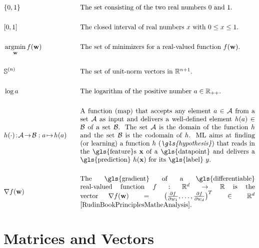 \newpage
\begin{align}
		&\{0,1\}& \quad & \mbox{The set consisting of the two real numbers $0$ and $1$.} \nonumber \\[5mm]
	&[0,1] &\quad &\mbox{The closed interval of real numbers $x$ with $0 \leq x \leq 1$. } \nonumber \\[5mm]
    &\argmin_{\weights} f(\weights) &\quad &\mbox{The set of minimizers for a real-valued function $f(\weights)$.  } \nonumber \\[5mm]
    &\sphere{\nrnodes} &\quad &\mbox{The set of unit-norm vectors in $\mathbb{R}^{\nrnodes+1}$.  } \nonumber \\[5mm]
	 &\log a &\quad &\mbox{The logarithm of the positive number $a \in \mathbb{R}_{++}$.  } \nonumber \\[5mm]
	 &h(\cdot)\!:\!\mathcal{A}\!\rightarrow\!\mathcal{B} :  a \!\mapsto\!h(a) &\quad &\parbox{.75\textwidth}{
	 	A function (map) that accepts any element $a \in \mathcal{A}$ from a set $\mathcal{A}$ 
	 	as input and delivers a well-defined element $h(a) \in \mathcal{B}$ of a set $\mathcal{B}$. 
	 	The set $\mathcal{A}$ is the domain of the function $h$ and the set $\mathcal{B}$ is the 
	 	codomain of $h$. ML aims at finding (or learning) a function $\hypothesis$ (\emph{\gls{hypothesis}}) 
	 	that reads in the \gls{feature}s $\featurevec$ of a \gls{datapoint} and delivers a \gls{prediction} $h(\featurevec)$
	 	for its \gls{label} $\truelabel$.} \nonumber  \\[5mm]	
	 	&\nabla f(\weights) & \quad & \parbox{.75\textwidth}{The \gls{gradient} of a \gls{differentiable} real-valued function 
	 	$f: \mathbb{R}^{\featuredim}\rightarrow \mathbb{R}$ is the vector 
	 	$\nabla f(\weights) = \big( \frac{\partial f}{\partial \weight_{1}},\ldots,\frac{\partial f}{\partial \weight_{\featuredim}}  \big)^{T} \in \mathbb{R}^{\featuredim}$ \cite[Ch. 9]{RudinBookPrinciplesMatheAnalysis}.}   \nonumber
\end{align} 
\section*{Matrices and Vectors} 

